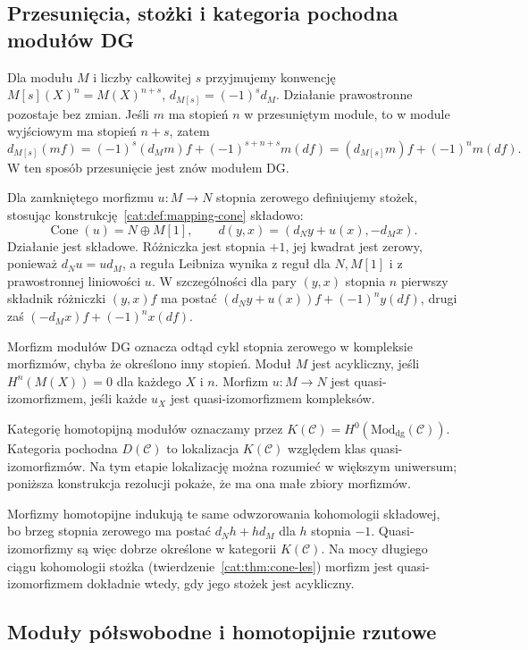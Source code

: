 \subsection{Przesunięcia, stożki i kategoria pochodna modułów DG}

Dla modułu $M$ i liczby całkowitej $s$ przyjmujemy konwencję $M[s](X)^n=M(X)^{n+s}$, $d_{M[s]}=(-1)^sd_M$. Działanie prawostronne pozostaje bez zmian. Jeśli $m$ ma stopień $n$ w przesuniętym module, to w module wyjściowym ma stopień $n+s$, zatem
\[
 d_{M[s]}(mf)=(-1)^s(d_Mm)f+(-1)^{s+n+s}m(df)
 =(d_{M[s]}m)f+(-1)^n m(df).
\]
W ten sposób przesunięcie jest znów modułem DG.

Dla zamkniętego morfizmu $u:M\to N$ stopnia zerowego definiujemy stożek, stosując konstrukcję~\ref{cat:def:mapping-cone} składowo:
\[
 \operatorname{Cone}(u)=N\oplus M[1],
 \qquad
 d(y,x)=(d_Ny+u(x),-d_Mx).
\]
Działanie jest składowe. Różniczka jest stopnia $+1$, jej kwadrat jest zerowy, ponieważ $d_Nu=ud_M$, a reguła Leibniza wynika z reguł dla $N,M[1]$ i z prawostronnej liniowości $u$. W szczególności dla pary $(y,x)$ stopnia $n$ pierwszy składnik różniczki $(y,x)f$ ma postać $(d_Ny+u(x))f+(-1)^ny(df)$, drugi zaś $(-d_Mx)f+(-1)^nx(df)$.

\begin{definicja}\label{cat:def:dg-module-derived}
Morfizm modułów DG oznacza odtąd cykl stopnia zerowego w kompleksie morfizmów, chyba że określono inny stopień. Moduł $M$ jest acykliczny, jeśli $H^n(M(X))=0$ dla każdego $X$ i $n$. Morfizm $u:M\to N$ jest quasi-izomorfizmem, jeśli każde $u_X$ jest quasi-izomorfizmem kompleksów.

Kategorię homotopijną modułów oznaczamy przez $K(\mathcal C)=H^0(\mathrm{Mod}_{\mathrm{dg}}(\mathcal C))$. Kategoria pochodna $D(\mathcal C)$ to lokalizacja $K(\mathcal C)$ względem klas quasi-izomorfizmów. Na tym etapie lokalizację można rozumieć w większym uniwersum; poniższa konstrukcja rezolucji pokaże, że ma ona małe zbiory morfizmów.
\end{definicja}

Morfizmy homotopijne indukują te same odwzorowania kohomologii składowej, bo brzeg stopnia zerowego ma postać $d_Nh+hd_M$ dla $h$ stopnia $-1$. Quasi-izomorfizmy są więc dobrze określone w kategorii $K(\mathcal C)$. Na mocy długiego ciągu kohomologii stożka (twierdzenie~\ref{cat:thm:cone-les}) morfizm jest quasi-izomorfizmem dokładnie wtedy, gdy jego stożek jest acykliczny.

\subsection{Moduły półswobodne i homotopijnie rzutowe}

